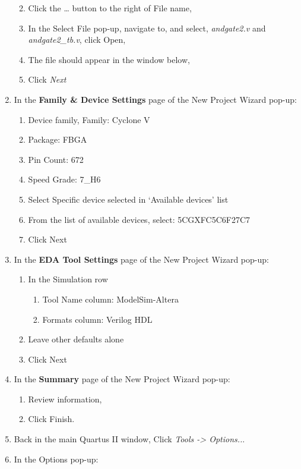\documentclass[
]{article}
\begin{document}
\begin{enumerate}
  \begin{enumerate}
  \def\labelenumii{\alph{enumii}.}
  \item
    Click the \ldots{} button to the right of File name,
  \item
    In the Select File pop-up, navigate to, and select,
    \emph{andgate2.v} and \emph{andgate2\_tb.v}, click Open,
  \item
    The file should appear in the window below,
  \item
    Click \emph{Next}
  \end{enumerate}
\item
  In the \textbf{Family \& Device Settings} page of the New Project
  Wizard pop-up:

  \begin{enumerate}
  \def\labelenumii{\alph{enumii}.}
  \item
    Device family, Family: Cyclone V
  \item
    Package: FBGA
  \item
    Pin Count: 672
  \item
    Speed Grade: 7\_H6
  \item
    Select Specific device selected in `Available devices' list
  \item
    From the list of available devices, select: 5CGXFC5C6F27C7
  \item
    Click Next
  \end{enumerate}
\item
  In the \textbf{EDA Tool Settings} page of the New Project Wizard
  pop-up:

  \begin{enumerate}
  \def\labelenumii{\alph{enumii}.}
  \item
    In the Simulation row

    \begin{enumerate}
    \def\labelenumiii{\roman{enumiii}.}
    \item
      Tool Name column: ModelSim-Altera
    \item
      Formats column: Verilog HDL
    \end{enumerate}
  \item
    Leave other defaults alone
  \item
    Click Next
  \end{enumerate}
\item
  In the \textbf{Summary} page of the New Project Wizard pop-up:

  \begin{enumerate}
  \def\labelenumii{\alph{enumii}.}
  \item
    Review information,
  \item
    Click Finish.
  \end{enumerate}
\item
  Back in the main Quartus II window, Click \emph{Tools -\textgreater{}
  Options..}.
\item
  In the Options pop-up:


\end{enumerate}
\end{document}
